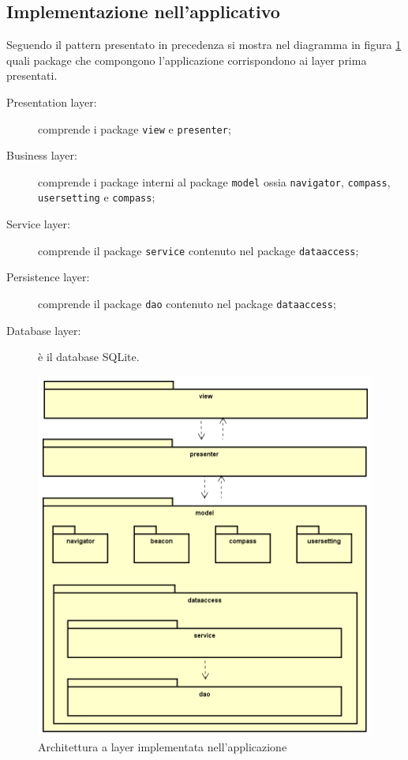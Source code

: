 \documentclass[../DefinizioneDiProdotto.tex,lanscape]{subfiles}
\begin{document}
	\newpage
	\subsection{Implementazione nell'applicativo}
		Seguendo il pattern presentato in precedenza si mostra nel diagramma in figura \ref{fig:multi-tier} quali package che compongono l'applicazione corrispondono ai layer prima presentati.
		\begin{description}
			\item[Presentation layer:] comprende i package \verb|view| e \verb|presenter|;
			\item[Business layer:] comprende i package interni al package \verb|model| ossia \verb|navigator|, \verb|compass|, \verb|usersetting| e \verb|compass|;
			\item[Service layer:] comprende il package \verb|service| contenuto nel package \verb|dataaccess|;
			\item[Persistence layer:] comprende il package \verb|dao| contenuto nel package \verb|dataaccess|;
			\item[Database layer:] è il database SQLite.
		\end{description}
		
	\begin{figure} [h]
		\centering
		\includegraphics[scale=0.45]{img/package/multi-tier}
		\caption{Architettura a layer implementata nell'applicazione}
		\label{fig:multi-tier}
	\end{figure}
\end{document}
